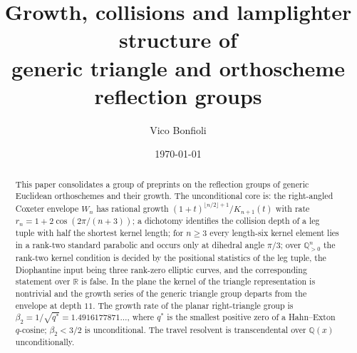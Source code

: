 \documentclass[11pt]{article}
\title{Growth, collisions and lamplighter structure of\\ generic triangle and orthoscheme reflection groups}
\author{Vico Bonfioli}
\date{\today}
\theoremstyle{definition}
\theoremstyle{remark}
\theoremstyle{definition}
\newcommand{\Q}{\mathbb{Q}}
\newcommand{\R}{\mathbb{R}}
\begin{document}
\maketitle

\begin{abstract}
This paper consolidates a group of preprints on the reflection groups of generic Euclidean
orthoschemes and their growth. The unconditional core is: the right-angled Coxeter envelope
$W_n$ has rational growth $(1+t)^{\lfloor n/2\rfloor+1}/K_{n+1}(t)$ with rate
$r_n=1+2\cos(2\pi/(n+3))$; a dichotomy identifies the collision depth of a leg tuple with half
the shortest kernel length; for $n\ge3$ every length-six kernel element lies in a rank-two
standard parabolic and occurs only at dihedral angle $\pi/3$; over $\Q_{>0}^n$ the rank-two
kernel condition is decided by the positional statistics of the leg tuple, the Diophantine input
being three rank-zero elliptic curves, and the corresponding statement over $\R$ is false. In the
plane the kernel of the triangle representation is nontrivial and the growth series of the
generic triangle group departs from the envelope at depth $11$. The growth rate of the planar
right-triangle group is $\beta_2=1/\sqrt{q^\ast}=1.4916177871\ldots$, where $q^\ast$ is the
smallest positive zero of a Hahn--Exton $q$-cosine; $\beta_2<3/2$ is unconditional. The travel
resolvent is transcendental over $\Q(x)$ unconditionally.


\end{abstract}
\end{document}
